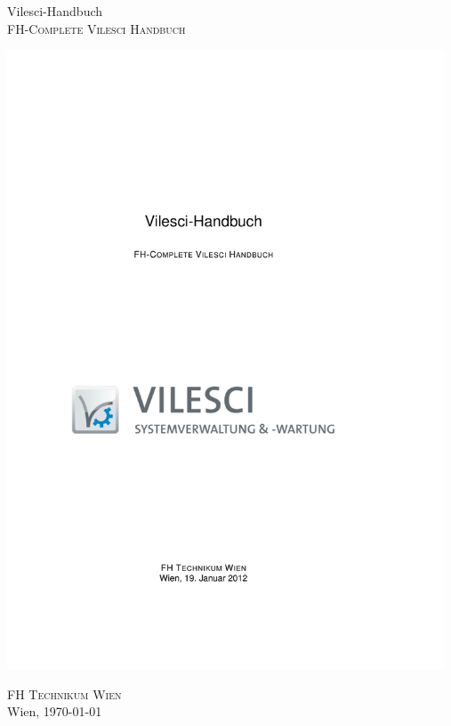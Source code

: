 %
%

\begin{titlepage}
\begin{center}
\vspace*{40mm} \huge Vilesci-Handbuch\\
\vspace*{10mm}
\large \textsc{FH-Complete Vilesci Handbuch}

\vfill \includegraphics[width=130mm]{vilesci}
	
\vfill \textsc{FH Technikum Wien}\\

Wien, \today
\end{center}
\end{titlepage}